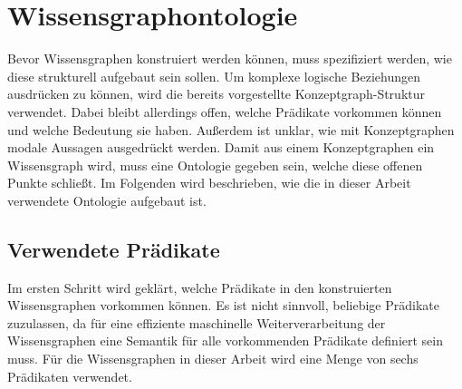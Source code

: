 \section{Wissensgraphontologie}%
\label{sec:text2kg:ontology}

Bevor Wissensgraphen konstruiert werden können, muss spezifiziert werden, wie diese strukturell aufgebaut sein sollen.
Um komplexe logische Beziehungen ausdrücken zu können, wird die bereits vorgestellte Konzeptgraph-Struktur verwendet.
Dabei bleibt allerdings offen, welche Prädikate vorkommen können und welche Bedeutung sie haben.
Außerdem ist unklar, wie mit Konzeptgraphen modale Aussagen ausgedrückt werden.
Damit aus einem Konzeptgraphen ein Wissensgraph wird, muss eine Ontologie gegeben sein, welche diese offenen Punkte schließt.
Im Folgenden wird beschrieben, wie die in dieser Arbeit verwendete Ontologie aufgebaut ist.

\subsection{Verwendete Prädikate}%
\label{sec:text2kg:ontology:pred}

Im ersten Schritt wird geklärt, welche Prädikate in den konstruierten Wissensgraphen vorkommen können.
Es ist nicht sinnvoll, beliebige Prädikate zuzulassen, da für eine effiziente maschinelle Weiterverarbeitung der Wissensgraphen eine Semantik für alle vorkommenden Prädikate definiert sein muss.
Für die Wissensgraphen in dieser Arbeit wird eine Menge von sechs Prädikaten verwendet.

